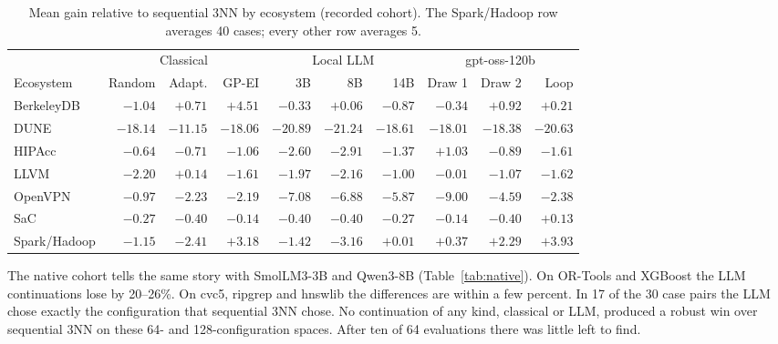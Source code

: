 \begin{table}[t]
\centering
\caption{Mean gain relative to sequential 3NN by ecosystem (recorded cohort). The Spark/Hadoop row averages 40 cases; every other row averages 5.}
\label{tab:eco}
\small
\setlength{\tabcolsep}{4pt}
\begin{tabular}{lrrrrrrrrr}
\toprule
 & \multicolumn{3}{c}{Classical} & \multicolumn{3}{c}{Local LLM} & \multicolumn{3}{c}{gpt-oss-120b} \\
\cmidrule(lr){2-4}\cmidrule(lr){5-7}\cmidrule(lr){8-10}
Ecosystem & Random & Adapt. & GP-EI & 3B & 8B & 14B & Draw 1 & Draw 2 & Loop \\
\midrule
BerkeleyDB & $-1.04$ & $+0.71$ & $+4.51$ & $-0.33$ & $+0.06$ & $-0.87$ & $-0.34$ & $+0.92$ & $+0.21$ \\
DUNE & $-18.14$ & $-11.15$ & $-18.06$ & $-20.89$ & $-21.24$ & $-18.61$ & $-18.01$ & $-18.38$ & $-20.63$ \\
HIPAcc & $-0.64$ & $-0.71$ & $-1.06$ & $-2.60$ & $-2.91$ & $-1.37$ & $+1.03$ & $-0.89$ & $-1.61$ \\
LLVM & $-2.20$ & $+0.14$ & $-1.61$ & $-1.97$ & $-2.16$ & $-1.00$ & $-0.01$ & $-1.07$ & $-1.62$ \\
OpenVPN & $-0.97$ & $-2.23$ & $-2.19$ & $-7.08$ & $-6.88$ & $-5.87$ & $-9.00$ & $-4.59$ & $-2.38$ \\
SaC & $-0.27$ & $-0.40$ & $-0.14$ & $-0.40$ & $-0.40$ & $-0.27$ & $-0.14$ & $-0.40$ & $+0.13$ \\
Spark/Hadoop & $-1.15$ & $-2.41$ & $+3.18$ & $-1.42$ & $-3.16$ & $+0.01$ & $+0.37$ & $+2.29$ & $+3.93$ \\
\bottomrule
\end{tabular}
\end{table}

The native cohort tells the same story with SmolLM3-3B and Qwen3-8B (Table~\ref{tab:native}). On OR-Tools and XGBoost the LLM continuations lose by 20--26\%. On cvc5, ripgrep and hnswlib the differences are within a few percent. In 17 of the 30 case pairs the LLM chose exactly the configuration that sequential 3NN chose. No continuation of any kind, classical or LLM, produced a robust win over sequential 3NN on these 64- and 128-configuration spaces. After ten of 64 evaluations there was little left to find.

